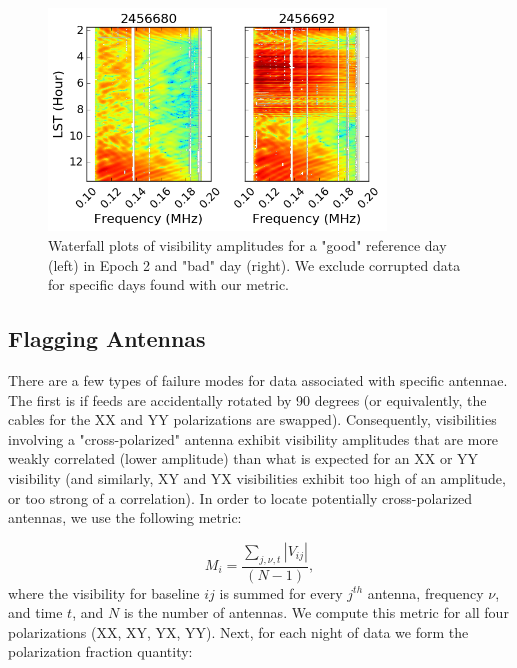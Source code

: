\begin{figure}
	\centering
	\includegraphics[width=0.8\textwidth]{plots/psa128_badday.png}
	\caption{Waterfall plots of visibility amplitudes for a "good" reference day (left) in Epoch 2 and "bad" day (right). We exclude corrupted data for specific days found with our metric.}
	\label{fig:psa128_badday}
\end{figure}

\subsection{Flagging Antennas}
\label{sec:psa128_badant}

There are a few types of failure modes for data associated with specific antennae. The first is if feeds are accidentally rotated by 90 degrees (or equivalently, the cables for the XX and YY polarizations are swapped). Consequently, visibilities involving a "cross-polarized" antenna exhibit visibility amplitudes that are more weakly correlated (lower amplitude) than what is expected for an XX or YY visibility (and similarly, XY and YX visibilities exhibit too high of an amplitude, or too strong of a correlation). In order to locate potentially cross-polarized antennas, we use the following metric:

\begin{equation}
\label{eq:psa128_badant}
M_{i} = \frac{\sum\limits_{j,\nu,t} |V_{ij}|}{(N-1)},
\end{equation}
where the visibility for baseline $ij$ is summed for every $j^{th}$ antenna, frequency $\nu$, and time $t$, and $N$ is the number of antennas. We compute this metric for all four polarizations (XX, XY, YX, YY). Next, for each night of data we form the polarization fraction quantity:

